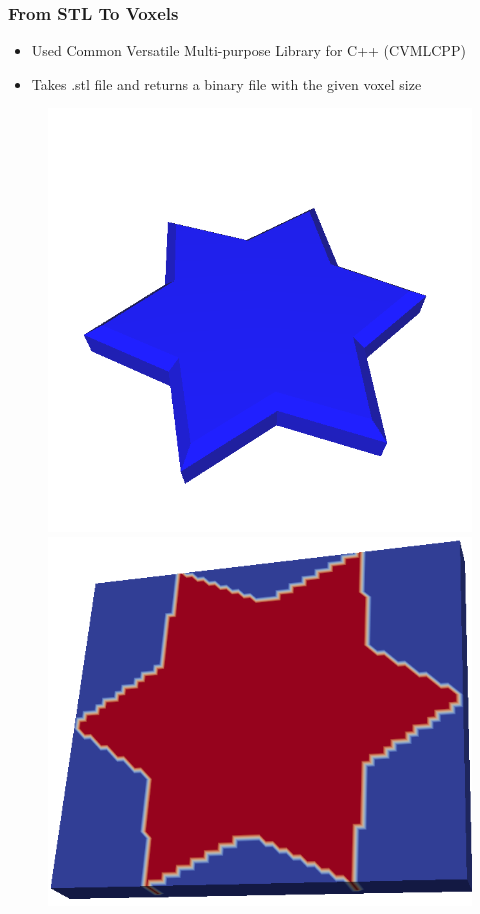 \begin{frame}
		\frametitle{From STL To Voxels}
		\begin{minipage}{0.85\textwidth}
			\begin{itemize}
			\item Used Common Versatile Multi-purpose Library for C++ (CVMLCPP)
			\item Takes .stl file and returns a binary file with the given voxel size
			\end{itemize}
			\centering
			\begin{figure}
			\includegraphics[scale=0.15]{Pictures/STLToVoxels/Star_STL.png}
			\includegraphics[scale=0.15]{Pictures/STLToVoxels/Star_VTK_Trans.png}

\end{figure}
\end{minipage}
\end{frame}
